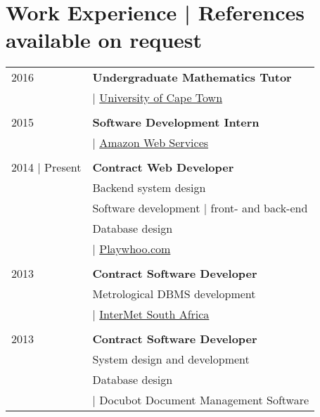 \section{Work Experience \footnotesize | References available on request}

\begin{tabular}{R{2.5cm}|l}

2016           & \textbf{Undergraduate Mathematics Tutor}\\
               & | \href{http://uct.ac.za}{University of Cape Town}\\
               & \\

2015           & \textbf{Software Development Intern }\\
               & | \href{https://aws.amazon.com}{Amazon Web Services}\\
               & \\

2014 | Present & \textbf{Contract Web Developer}\\
               & Backend system design\\
               & Software development | front- and  back-end\\
               & Database design\\
               & | \href{https://playwhoo.com}{Playwhoo.com}\\
               & \\

2013           & \textbf{Contract Software Developer}\\
               & Metrological DBMS development\\
               & | \href{http://www.diel.co.za}{InterMet South Africa}\\
               & \\

2013           & \textbf{Contract Software Developer}\\
               & System design and development\\
               & Database design\\
               & | Docubot Document Management Software
\end{tabular}

